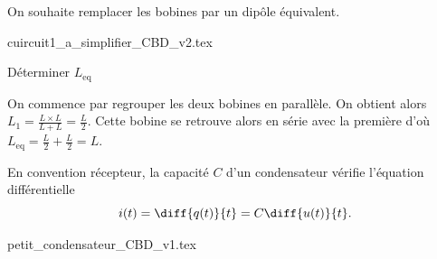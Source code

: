 On souhaite remplacer les bobines par un dipôle équivalent.

\begin{center}
{cuircuit1_a_simplifier_CBD_v2.tex}
\end{center}

\debutEntrainement

\begin{enonce}
Déterminer $L_\text{eq}$
\end{enonce}


\begin{corrige}
On commence par regrouper les deux bobines en parallèle. On obtient alors $L_1 = \frac{L\times L}{L+L} = \frac{L}{2}$. Cette bobine se retrouve alors en série avec la première d'où $L_\text{eq} = \frac{L}{2} + \frac{L}{2} = L$.
\end{corrige}

\finEntrainement



\bigskip
\bigskip
\bigskip


\bigskip

En convention récepteur, la capacité $C$ d'un condensateur vérifie l'équation différentielle 
\[
i(t)=\diff{q(t)}{t}=C\diff{u(t)}{t}.
\] 

\begin{center}
{petit_condensateur_CBD_v1.tex}
\end{center}





